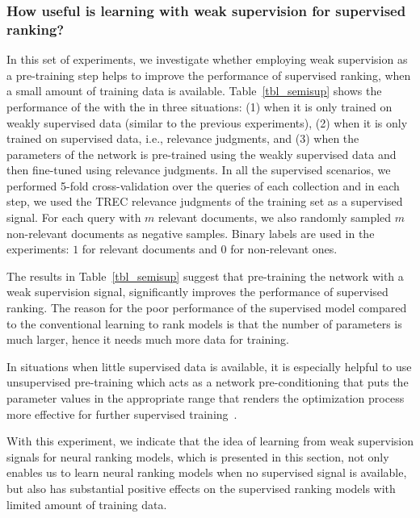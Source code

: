 
\subsubsection{How useful is learning with weak supervision for supervised ranking?}
%
In this set of experiments, we investigate whether employing weak supervision as a pre-training step helps to improve the performance of supervised ranking, when a small amount of training data is available. Table~\ref{tbl_semisup} shows the performance of the \modelthree with the \feedthree in three situations: (1) when it is only trained on weakly supervised data (similar to the previous experiments), (2) when it is only trained on supervised data, i.e., relevance judgments, and (3) when the parameters of the network is pre-trained using the weakly supervised data and then fine-tuned using relevance judgments.
%
In all the supervised scenarios, we performed 5-fold cross-validation over the queries of each collection and in each step, we used the TREC relevance judgments of the training set as a supervised signal. For each query with $m$ relevant documents, we also randomly sampled $m$ non-relevant documents as negative samples. Binary labels are used in the experiments: $1$ for relevant documents and $0$ for non-relevant ones.

The results in Table~\ref{tbl_semisup} suggest that pre-training the network with a weak supervision signal, significantly improves the performance of supervised ranking.
%
The reason for the poor performance of the supervised model compared to the conventional learning to rank models is that the number of parameters is much larger, hence it needs much more data for training.

In situations when little supervised data is available, it is especially helpful to use unsupervised pre-training which acts as a network pre-conditioning that puts the parameter values in the appropriate range that renders the optimization process more effective for further supervised training~\citep{Rrhan:2010}.

With this experiment, we indicate that the idea of learning from weak supervision signals for neural ranking models, which is presented in this section, not only enables us to learn neural ranking models when no supervised signal is available, but also has substantial positive effects on the supervised ranking models with limited amount of training data. 